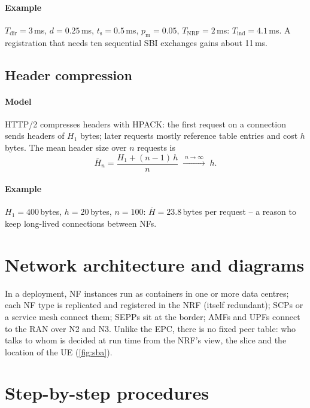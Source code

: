 \documentclass[11pt,a4paper]{article}
\begin{document}
\paragraph{Example} $T_{\mathrm{dir}} = 3$\,ms, $d = 0.25$\,ms, $t_{\mathrm{s}} = 0.5$\,ms, $p_{\mathrm{m}} = 0.05$, $T_{\mathrm{NRF}} = 2$\,ms:
$T_{\mathrm{ind}} = 4.1$\,ms. A registration that needs ten sequential SBI exchanges gains about 11\,ms.

\subsection{Header compression}\label{sec:hpack}
\paragraph{Model} HTTP/2 compresses headers with HPACK: the first request on a connection sends headers of $H_1$ bytes; later
requests mostly reference table entries and cost $h$ bytes. The mean header size over $n$ requests is
\begin{equation}\label{eq:hpack}
  \bar H_n = \frac{H_1 + (n-1)\,h}{n} \;\xrightarrow{\;n\to\infty\;}\; h .
\end{equation}
\paragraph{Example} $H_1 = 400$\,bytes, $h = 20$\,bytes, $n = 100$: $\bar H = 23.8$\,bytes per request -- a reason to keep long-lived
connections between NFs.

\section{Network architecture and diagrams}
In a deployment, NF instances run as containers in one or more data centres; each NF type is replicated and registered in the
NRF (itself redundant); SCPs or a service mesh connect them; SEPPs sit at the border; AMFs and UPFs connect to the RAN over N2 and
N3. Unlike the EPC, there is no fixed peer table: who talks to whom is decided at run time from the NRF's view, the slice and the
location of the UE (\cref{fig:sba}).

\section{Step-by-step procedures}
\end{document}
